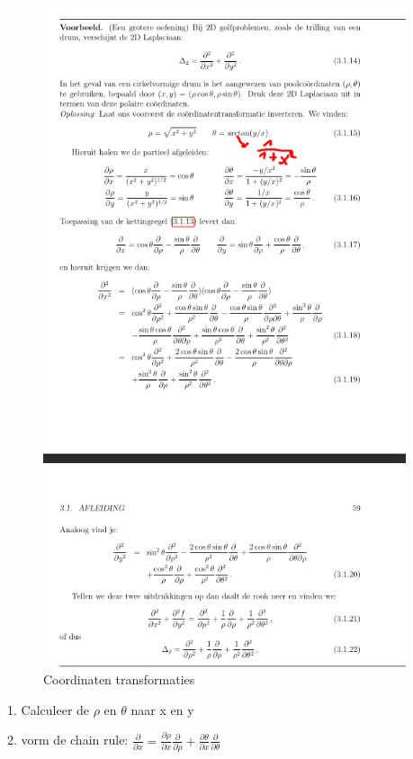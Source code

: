 \documentclass[a4paper]{report}
\begin{document}
\begin{figure}[H]
	\begin{center}
		\includegraphics[width=0.95\textwidth]{./images/coordinaten.png}
	\end{center}
	\caption{Coordinaten transformaties}
	\label{}
\end{figure}

1. Calculeer de $\rho$ en $\theta$ naar x en y

2. vorm de chain rule: $\frac{\partial}{\partial x} = \frac{\partial \rho}{\partial x} \frac{\partial}{\partial \rho} + \frac{\partial \theta}{\partial x} \frac{\partial}{\partial \theta}$
\end{document}
